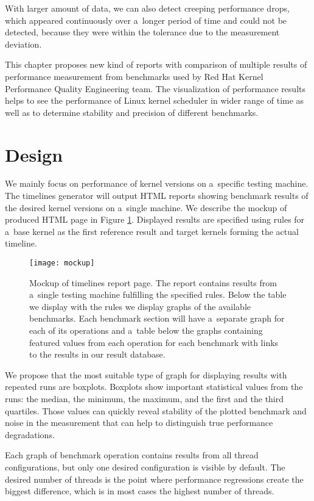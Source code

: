 With larger amount of data, we can also detect creeping performance drops, which
appeared continuously over a~longer period of time and could not be detected,
because they were within the tolerance due to the measurement deviation.

This chapter proposes new kind of reports with comparison of multiple results of
performance measurement from benchmarks used by Red Hat Kernel Performance
Quality Engineering team. The visualization of performance results helps to see
the performance of Linux kernel scheduler in wider range of time as well as to
determine stability and precision of different benchmarks.

\section{Design}
We mainly focus on performance of kernel versions on a~specific testing machine.
The timelines generator will output HTML reports showing benchmark results of
the desired kernel versions on a~single machine. We describe the mockup of
produced HTML page in Figure \ref{fig:mockup}. Displayed results are specified
using rules for a~base kernel as the first reference result and target kernels
forming the actual timeline.

\begin{figure}
  \centering
  \texttt{[image: mockup]}
  \caption{Mockup of timelines report page. The report contains results from
a~single testing machine fulfilling the specified rules. Below the table we
    display with the rules we display graphs of the available benchmarks. Each
    benchmark section will have a~separate graph for each of its operations and
    a~table below the graphs containing featured values from each operation for
    each benchmark with links to the results in our result database.}
  \label{fig:mockup}
\end{figure}

We propose that the most suitable type of graph for displaying results with
repeated runs are boxplots. Boxplots show important statistical values from the
runs: the median, the minimum, the maximum, and the first and the third
quartiles. Those values can quickly reveal stability of the plotted benchmark and
noise in the measurement that can help to distinguish true performance
degradations.

Each graph of benchmark operation contains results from all thread
configurations, but only one desired configuration is visible by default.
The desired number of threads is the point where performance regressions create
the biggest difference, which is in most cases the highest number of threads.

